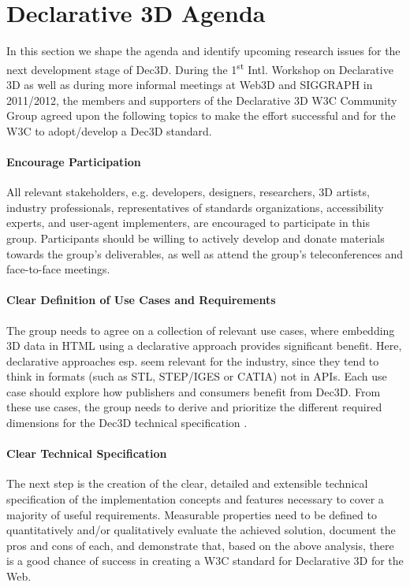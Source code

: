 \documentclass{acmsiggraph}
\begin{document}
\section{Declarative 3D Agenda}
\label{sec:Agenda}

In this section we shape the agenda and identify upcoming research issues for the next development stage of Dec3D.
During the 1\textsuperscript{st} Intl. Workshop on Declarative 3D \cite{Dec3D2012} as well as during more informal meetings at Web3D and SIGGRAPH in 2011/2012, the members and supporters of the Declarative 3D W3C Community Group agreed upon the following topics to make the effort successful and for the W3C to adopt/develop a Dec3D standard.

\paragraph{Encourage Participation}
All relevant stakeholders, e.g. developers, designers, researchers, 3D artists, industry professionals, representatives of standards organizations, accessibility experts, and user-agent implementers, are encouraged to participate in this group. Participants should be willing to actively develop and donate materials towards the group's deliverables, as well as attend the group's teleconferences and face-to-face meetings.

\paragraph{Clear Definition of Use Cases and Requirements}
The group needs to agree on a collection of relevant use cases, where embedding 3D data in HTML using a declarative approach provides significant benefit. Here, declarative approaches esp. seem relevant for the industry, since they tend to think in formats (such as STL, STEP/IGES or CATIA) not in APIs.
Each use case should explore how publishers and consumers benefit from Dec3D. From these use cases, the group needs to derive and prioritize the different required dimensions for the Dec3D technical specification \cite{JankowskiDec3D2012,LeFeuvreDec3D2012}.

\paragraph{Clear Technical Specification}
The next step is the creation of the clear, detailed and extensible technical specification of the implementation concepts and features necessary to cover a majority of useful requirements. Measurable properties need to be defined to quantitatively and/or qualitatively evaluate the achieved solution, document the pros and cons of each, and demonstrate that, based on the above analysis, there is a good chance of success in creating a W3C standard for Declarative 3D for the Web.
\end{document}
